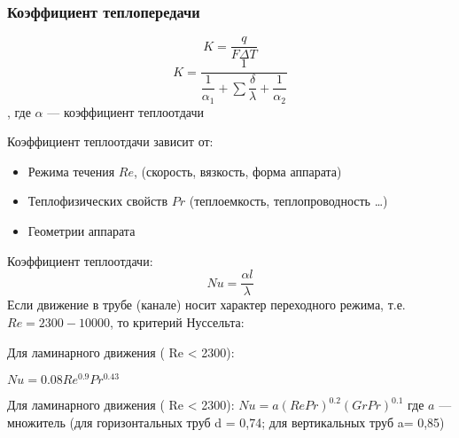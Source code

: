 \begin{frame}
	\frametitle{Коэффициент теплопередачи}
	\begin{equation}
		K = \dfrac {q}  { F \Delta T }
	\end{equation}
	\begin{equation}
		K = \dfrac {1} { \dfrac{1} {\alpha_1} + \sum{\dfrac {\delta} {\lambda}} + \dfrac {1} {\alpha_2} }
	\end{equation}
	, где $\alpha$ --- коэффициент теплоотдачи
	
	Коэффициент теплоотдачи зависит от:
	\begin{itemize}
		\item Режима течения $Re$, (скорость, вязкость, форма аппарата)
		\item Теплофизических свойств $Pr$ (теплоемкость, теплопроводность …)
		\item Геометрии аппарата
	\end{itemize}
	
\end{frame}

\begin{frame}
	Коэффициент теплоотдачи:
	\begin{equation}
		Nu = \dfrac { \alpha l } {\lambda}
	\end{equation}
	Если движение в трубе (канале) носит характер переходного режима, т.е. $Re = 2300 - 10000$, то критерий Нуссельта:
	
	Для ламинарного движения ( Re < 2300):
	
	$Nu = 0.08 Re^{0.9} Pr^{0.43}$
	
	Для ламинарного движения ( Re < 2300):
	$Nu =a ( Re Pr )^{0.2} ( Gr Pr )^{0.1}$
	где $a$ --- множитель (для горизонтальных труб d = 0,74; для вертикальных труб a= 0,85)
\end{frame}